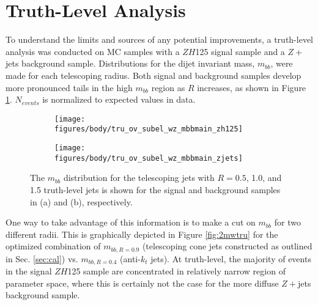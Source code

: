 \section{Truth-Level Analysis}
\label{sec:tru}
To understand the limits and sources of any potential improvements, a truth-level analysis was conducted on MC samples with a $ZH$125 signal sample and a $Z+$jets background sample. Distributions for the dijet invariant mass, $m_{bb}$, were made for each telescoping radius.%
  Both signal and background samples develop more pronounced tails in the high $m_{bb}$ region as $R$ increases, as shown in Figure \ref{fig:multradtru}.  $N_{events}$ is normalized to expected values in data.

\begin{figure}[!htbp]\captionsetup{justification=centering}
\begin{center}
\begin{subfigure}[t]{18pc}\centering\texttt{[image: figures/body/tru\_ov\_subel\_wz\_mbbmain\_zh125]}\caption{}\end{subfigure}
\begin{subfigure}[t]{18pc}\centering\texttt{[image: figures/body/tru\_ov\_subel\_wz\_mbbmain\_zjets]}\caption{}\end{subfigure}
\caption{\label{fig:multradtru}The $m_{bb}$ distribution for the telescoping jets with $R=0.5$, 1.0, and 1.5 truth-level jets is shown for the signal and background samples in (a) and (b), respectively.}
\end{center}
\end{figure}

One way to take advantage of this information is to make a cut on $m_{bb}$ for two different radii.  This is graphically depicted in Figure \ref{fig:2mwtru} for the optimized combination of $m_{bb,R=0.9}$ (telescoping cone jets constructed as outlined in Sec. \ref{sec:cal}) vs. $m_{bb,R=0.4}$ (anti-$k_t$ jets).  At truth-level, the majority of events in the signal $ZH$125 sample are concentrated in relatively narrow region of parameter space, where this is certainly not the case for the more diffuse $Z+$jets background sample.

